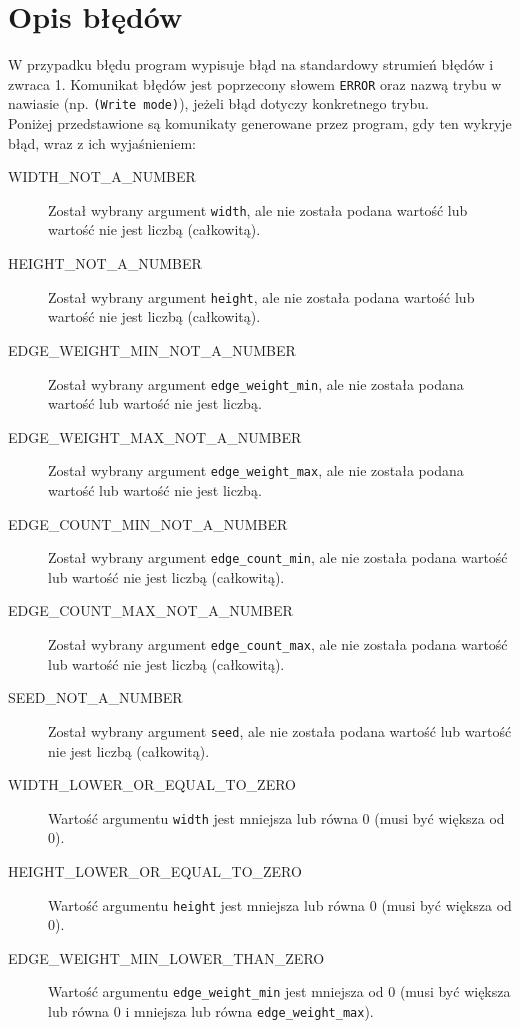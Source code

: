 \documentclass[11pt,a4paper]{report}
\begin{document}
    \section{Opis błędów}
    W przypadku błędu program wypisuje błąd na standardowy strumień błędów i zwraca 1. Komunikat błędów jest poprzecony słowem \verb|ERROR| oraz nazwą trybu w nawiasie (np. \verb|(Write mode)|), jeżeli błąd dotyczy konkretnego trybu.\\
    Poniżej przedstawione są komunikaty generowane przez program, gdy ten wykryje błąd, wraz z ich wyjaśnieniem:\\
    \begin{description}
        \item[WIDTH\_NOT\_A\_NUMBER] Został wybrany argument \verb|width|, ale nie została podana wartość lub wartość nie jest liczbą (całkowitą).
        \item[HEIGHT\_NOT\_A\_NUMBER] Został wybrany argument \verb|height|, ale nie została podana wartość lub wartość nie jest liczbą (całkowitą).
        \item[EDGE\_WEIGHT\_MIN\_NOT\_A\_NUMBER] Został wybrany argument \verb|edge_weight_min|, ale nie została podana wartość lub wartość nie jest liczbą.
        \item[EDGE\_WEIGHT\_MAX\_NOT\_A\_NUMBER] Został wybrany argument \verb|edge_weight_max|, ale nie została podana wartość lub wartość nie jest liczbą.
        \item[EDGE\_COUNT\_MIN\_NOT\_A\_NUMBER] Został wybrany argument \verb|edge_count_min|, ale nie została podana wartość lub wartość nie jest liczbą (całkowitą).
        \item[EDGE\_COUNT\_MAX\_NOT\_A\_NUMBER] Został wybrany argument \verb|edge_count_max|, ale nie została podana wartość lub wartość nie jest liczbą (całkowitą).
        \item[SEED\_NOT\_A\_NUMBER] Został wybrany argument \verb|seed|, ale nie została podana wartość lub wartość nie jest liczbą (całkowitą).
        \item[WIDTH\_LOWER\_OR\_EQUAL\_TO\_ZERO] Wartość argumentu \verb|width| jest mniejsza lub równa 0 (musi być większa od 0).
        \item[HEIGHT\_LOWER\_OR\_EQUAL\_TO\_ZERO] Wartość argumentu \verb|height| jest mniejsza lub równa 0 (musi być większa od 0).
        \item[EDGE\_WEIGHT\_MIN\_LOWER\_THAN\_ZERO] Wartość argumentu \verb|edge_weight_min| jest mniejsza od 0 (musi być większa lub równa 0 i mniejsza lub równa \verb|edge_weight_max|).

\end{description}
\end{document}
